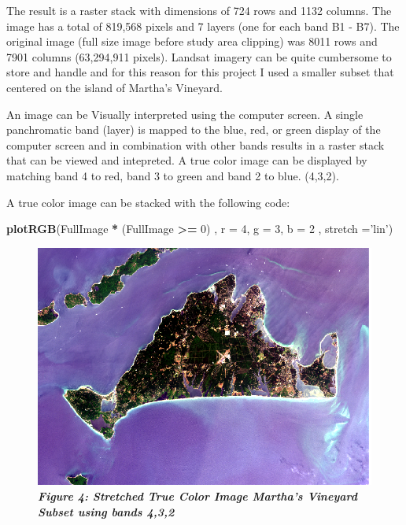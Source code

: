 \documentclass[]{article}
\newenvironment{Shaded}{\begin{snugshade}}{\end{snugshade}}
\newcommand{\KeywordTok}[1]{\textcolor[rgb]{0.13,0.29,0.53}{\textbf{#1}}}
\newcommand{\DataTypeTok}[1]{\textcolor[rgb]{0.13,0.29,0.53}{#1}}
\newcommand{\DecValTok}[1]{\textcolor[rgb]{0.00,0.00,0.81}{#1}}
\newcommand{\StringTok}[1]{\textcolor[rgb]{0.31,0.60,0.02}{#1}}
\newcommand{\OperatorTok}[1]{\textcolor[rgb]{0.81,0.36,0.00}{\textbf{#1}}}
\newcommand{\NormalTok}[1]{#1}
\begin{document}
The result is a raster stack with dimensions of 724 rows and 1132
columns. The image has a total of 819,568 pixels and 7 layers (one for
each band B1 - B7). The original image (full size image before study
area clipping) was 8011 rows and 7901 columns (63,294,911 pixels).
Landsat imagery can be quite cumbersome to store and handle and for this
reason for this project I used a smaller subset that centered on the
island of Martha's Vineyard.

An image can be Visually interpreted using the computer screen. A single
panchromatic band (layer) is mapped to the blue, red, or green display
of the computer screen and in combination with other bands results in a
raster stack that can be viewed and intepreted. A true color image can
be displayed by matching band 4 to red, band 3 to green and band 2 to
blue. (4,3,2).

A true color image can be stacked with the following code:

\begin{Shaded}
\begin{Highlighting}[]
\KeywordTok{plotRGB}\NormalTok{(FullImage }\OperatorTok{*}\StringTok{ }\NormalTok{(FullImage }\OperatorTok{>=}\StringTok{ }\DecValTok{0}\NormalTok{)}
\NormalTok{        , }\DataTypeTok{r =} \DecValTok{4}\NormalTok{, }\DataTypeTok{g =} \DecValTok{3}\NormalTok{, }\DataTypeTok{b =} \DecValTok{2}
\NormalTok{        , }\DataTypeTok{stretch =}\StringTok{'lin'}\NormalTok{)}
\end{Highlighting}
\end{Shaded}

\begin{figure}
\centering
\includegraphics{images/TrueColor_MV.png}
\caption{\textbf{\emph{Figure 4: Stretched True Color Image Martha's
Vineyard Subset using bands 4,3,2}}}
\end{figure}
\end{document}
